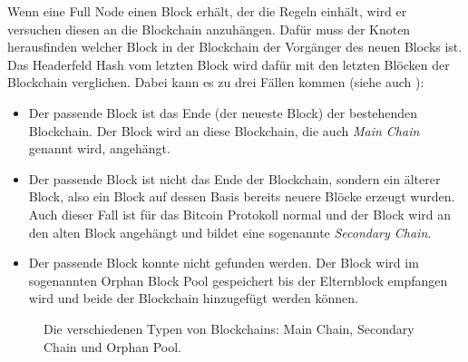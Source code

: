 \documentclass[ngerman,runningheads,a4paper]{llncs}[2018/03/10]
\begin{document}
Wenn eine Full Node einen Block erhält, der die Regeln einhält, wird er versuchen diesen an die Blockchain anzuhängen. Dafür muss der Knoten herausfinden welcher Block in der Blockchain der Vorgänger des neuen Blocks ist. Das Headerfeld Hash vom letzten Block wird dafür mit den letzten Blöcken der Blockchain verglichen. Dabei kann es zu drei Fällen kommen (siehe auch ):

\begin{itemize}

\item Der passende Block ist das Ende (der neueste Block) der bestehenden Blockchain. Der Block wird an diese Blockchain, die auch \textit{Main Chain} genannt wird, angehängt.

\item Der passende Block ist nicht das Ende der Blockchain, sondern ein älterer Block, also ein Block auf dessen Basis bereits neuere Blöcke erzeugt wurden. Auch dieser Fall ist für das Bitcoin Protokoll normal und der Block wird an den alten Block angehängt und bildet eine sogenannte \textit{Secondary Chain}.

\item Der passende Block konnte nicht gefunden werden. Der Block wird im sogenannten Orphan Block Pool gespeichert bis der Elternblock empfangen wird und beide der Blockchain hinzugefügt werden können.

\end{itemize}

\begin{figure}
  \centering
  \caption{Die verschiedenen Typen von Blockchains: Main Chain, Secondary Chain und Orphan Pool.}
  \label{fig:blockchainTypes}
\end{figure}
\end{document}
